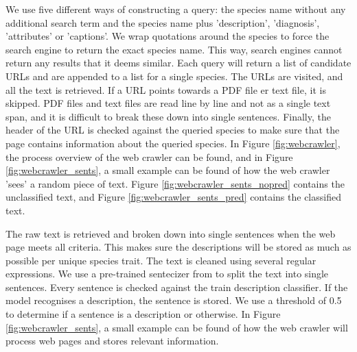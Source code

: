 \documentclass[a4paper, 12pt, oneside]{book} %
\begin{document}
We use five different ways of constructing a query: the species name without any additional search term and the species name plus 'description', 'diagnosis', 'attributes' or 'captions'.
We wrap quotations around the species to force the search engine to return the exact species name.
This way, search engines cannot return any results that it deems similar.
Each query will return a list of candidate URLs and are appended to a list for a single species.
The URLs are visited, and all the text is retrieved.
If a URL points towards a PDF file er text file, it is skipped.
PDF files and text files are read line by line and not as a single text span, and it is difficult to break these down into single sentences. 
Finally, the header of the URL is checked against the queried species to make sure that the page contains information about the queried species.
In Figure \ref{fig:webcrawler}, the process overview of the web crawler can be found, and in Figure \ref{fig:webcrawler_sents}, a small example can be found of how the web crawler 'sees' a random piece of text.
Figure \ref{fig:webcrawler_sents_nopred} contains the unclassified text, and Figure \ref{fig:webcrawler_sents_pred} contains the classified text.

The raw text is retrieved and broken down into single sentences when the web page meets all criteria. 
This makes sure the descriptions will be stored as much as possible per unique species trait.
The text is cleaned using several regular expressions. %
We use a pre-trained sentecizer from \textcite{wolf_huggingfaces_2020} to split the text into single sentences.
Every sentence is checked against the train description classifier.
If the model recognises a description, the sentence is stored. 
We use a threshold of 0.5 to determine if a sentence is a description or otherwise.
In Figure \ref{fig:webcrawler_sents}, a small example can be found of how the web crawler will process web pages and stores relevant information. 
\end{document}
